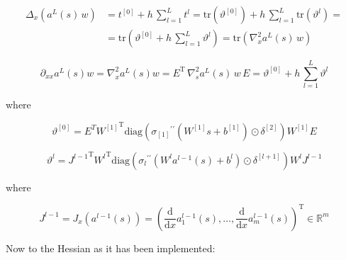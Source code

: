 \begin{align*}
    \Delta_x (a^{L}(s) \, w) & = t^{[0]} + h \, \sum^{L}_{l=1} t^{l} = \mathrm{tr}(\vartheta^{[0]}) + h \, \sum^{L}_{l=1} \mathrm{tr}(\vartheta^{l}) = \\
    & = \mathrm{tr} \left( \vartheta^{[0]} + h \, \sum^{L}_{l=1} \vartheta^{l} \right) = \mathrm{tr} \left( \nabla^{2}_x a^{L}(s) \, w \right)
\end{align*}

\begin{equation*}
    \partial_{xx} a^{L}(s) w = \nabla^{2}_x a^{L}(s) w = E^{\mathrm{T}} \, \nabla^{2}_s a^{L}(s) \, w \, E = \vartheta^{[0]} + h \, \sum^{L}_{l=1} \vartheta^{l}
\end{equation*}

where 

\begin{equation*}
    \vartheta^{[0]} = E^T {W^{[1]}}^{\mathrm{T}} \mathrm{diag}({\sigma_{[1]}}^{\prime \prime}(W^{[1]} s + b^{[1]}) \odot \delta^{[2]}) W^{[1]} E
\end{equation*}

\begin{equation*}
    \vartheta^{l} = {J^{l-1}}^{\mathrm{T}} {W^{l}}^{\mathrm{T}} \mathrm{diag}({\sigma_{l}}^{\prime \prime}(W^{l} a^{l-1}(s) + b^{l}) \odot \delta^{[l+1]}) W^{l} J^{l-1}
\end{equation*}

where 

\begin{equation*}
    J^{l-1} = J_x(a^{l-1}(s)) = \left( \frac{\mathrm{d}}{\mathrm{d} x} a^{l-1}_1(s), \ldots, \frac{\mathrm{d}}{\mathrm{d} x} a^{l-1}_m(s) \right)^{\mathrm{T}} \in \mathbb{R}^{m}
\end{equation*}


Now to the Hessian as it has been implemented: 

